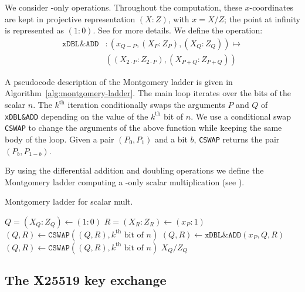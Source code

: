 We consider \xcoord-only operations. Throughout the computation,
these $x$-coordinates are kept in projective representation
$(X : Z)$, with $x = X/Z$; the point at infinity is represented as $(1:0)$.
See  for more details.
We define the operation:
\begin{align*}
  \texttt{xDBL\&ADD} & : (x_{Q-P}, (X_P:Z_P), (X_Q:Z_Q)) \mapsto              \\[-0.5ex]
                     & ((X_{2 \cdot P}:Z_{2 \cdot P}), (X_{P + Q}:Z_{P + Q}))
\end{align*}

A pseudocode description of the Montgomery ladder
is given in Algorithm~\ref{alg:montgomery-ladder}.
The main loop iterates over the bits of the scalar $n$.
The $k^{\text{th}}$ iteration conditionally swaps
the arguments $P$ and $Q$ of \texttt{xDBL\&ADD}
depending on the value of the $k^{\text{th}}$ bit of $n$.
We use a conditional swap \texttt{CSWAP} to change the arguments of the above
function while keeping the same body of the loop. \label{cswap}
Given a pair $(P_0, P_1)$ and a bit $b$, \texttt{CSWAP} returns the pair
$(P_b, P_{1-b})$.

By using the differential addition and doubling operations we define the Montgomery ladder
computing a \xcoord-only scalar multiplication (see ).

\begin{algorithm}
  \caption{Montgomery ladder for scalar mult.}
  \label{alg:montgomery-ladder}
  \begin{algorithmic}
    \STATE $Q = (X_Q:Z_Q) \leftarrow (1:0)$
    \STATE $R = (X_R:Z_R) \leftarrow (x_P:1)$
    \STATE $(Q,R) \leftarrow \texttt{CSWAP}((Q,R), k^{\text{th}}\text{ bit of }n)$
    \STATE $(Q,R) \leftarrow \texttt{xDBL\&ADD}(x_P,Q,R)$
    \STATE $(Q,R) \leftarrow \texttt{CSWAP}((Q,R), k^{\text{th}}\text{ bit of }n)$
    \ENDFOR
    \RETURN $X_Q/Z_Q$
  \end{algorithmic}
\end{algorithm}

\subsection{The X25519 key exchange}
\label{subsec:X25519-key-exchange}

